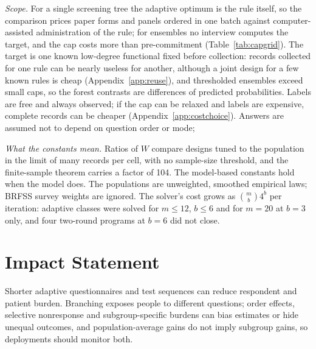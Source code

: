 \documentclass{article}
\begin{document}
\emph{Scope.} For a single screening tree the adaptive optimum is the rule itself, so the comparison prices paper forms and panels ordered in one batch against computer-assisted administration of the rule; for ensembles no interview computes the target, and the cap costs more than pre-commitment (Table~\ref{tab:capgrid}). The target is one known low-degree functional fixed before collection: records collected for one rule can be nearly useless for another, although a joint design for a few known rules is cheap (Appendix~\ref{app:reuse}), and thresholded ensembles exceed small caps, so the forest contrasts are differences of predicted probabilities. Labels are free and always observed; if the cap can be relaxed and labels are expensive, complete records can be cheaper (Appendix~\ref{app:costchoice}). Answers are assumed not to depend on question order or mode; \nOrderSentence{}

\emph{What the constants mean.} Ratios of $W$ compare designs tuned to the population in the limit of many records per cell, with no sample-size threshold, and the finite-sample theorem carries a factor of 104. The model-based constants hold when the model does. The populations are unweighted, smoothed empirical laws; BRFSS survey weights are ignored. The solver's cost grows as $\binom mb4^b$ per iteration: adaptive classes were solved for $m\le12$, $b\le6$ and for $m=20$ at $b=3$ only, and four two-round programs at $b=6$ did not close.

\section*{Impact Statement}
Shorter adaptive questionnaires and test sequences can reduce respondent and patient burden. Branching exposes people to different questions; order effects, selective nonresponse and subgroup-specific burdens can bias estimates or hide unequal outcomes, and population-average gains do not imply subgroup gains, so deployments should monitor both.



\clearpage
\onecolumn
\raggedbottom
\appendix
{}

\end{document}
